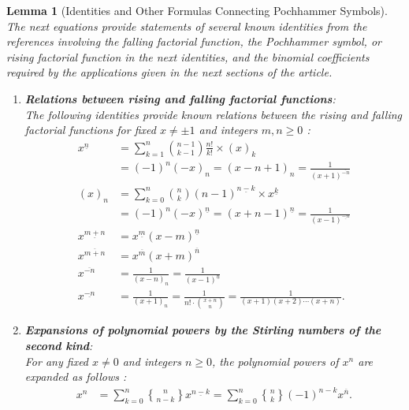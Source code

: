 \documentclass[12pt,reqno]{article}
\numberwithin{sfootnote}{section}
\numberwithin{equation}{section}
\newcommand{\itemlabel}[1]{\textbf{#1}: \\ }
\theoremstyle{plain}
\newtheorem{lemma}[theorem]{Lemma}
\theoremstyle{definition}
\theoremstyle{remark}
\newcommand{\cf}[0]{cf.\ }
\newcommand{\gkpSII}[2]{\ensuremath{\genfrac{\{}{\}}{0pt}{}{#1}{#2}}}
\newcommand{\FFactII}[2]{\ensuremath{#1^{\underline{#2}}}}
\newcommand{\RFactII}[2]{\ensuremath{#1^{\overline{#2}}}}
\newcommand{\Pochhammer}[2]{\ensuremath{\left(#1\right)_{#2}}}
\begin{document}
\begin{lemma}[Identities and Other Formulas Connecting Pochhammer Symbols] 
\label{lemma_footnote_PHSymbol_BinomIdents} 
The next equations provide statements of several known identities 
from the references involving the 
falling factorial function, the Pochhammer symbol, 
or rising factorial function in the next identities, and the 
binomial coefficients required by the applications given in the 
next sections of the article. 
\begin{enumerate} 
     \setlength{\itemsep}{-2mm} 

\item \itemlabel{Relations between rising and falling factorial functions} 
The following identities provide known relations between the 
rising and falling factorial functions for fixed $x \neq \pm 1$ and 
integers $m,n \geq 0$ 
\citep[\S 4.1.2, \S 5; \cf \S 4.3.1]{UC} 
\citep[\S 2, Ex.\ 2.17, 2.9, 2.16; \S 5.3; \S 6, Ex.\ 6.31, p.\ 552]{GKP}: 
\begin{align*} 
\tag{\em Connection Formulas} 
\FFactII{x}{n} 
     & = 
     \sum_{k=1}^{n} 
     \binom{n-1}{k-1} \frac{n!}{k!} \times \Pochhammer{x}{k} \\ 
     & = 
     (-1)^{n} \Pochhammer{-x}{n} = 
     \Pochhammer{x-n+1}{n} = 
     \frac{1}{\RFactII{(x+1)}{-n}} \\ 
\Pochhammer{x}{n} 
     & = 
     \sum_{k=0}^{n} 
     \binom{n}{k} \FFactII{(n-1)}{n-k} \times \FFactII{x}{k} \\ 
     & = 
     (-1)^{n} \FFactII{(-x)}{n} = 
     \FFactII{(x+n-1)}{n} = 
     \frac{1}{\FFactII{(x-1)}{-n}} \\ 
\tag{\em Generalized Exponent Laws} 
\FFactII{x}{m+n} 
     & = 
     \FFactII{x}{m} \FFactII{(x-m)}{n} \\ 
\RFactII{x}{m+n} 
     & = 
     \RFactII{x}{m} \RFactII{(x+m)}{n} \\  
\tag{\em Negative Rising and Falling Powers} 
\RFactII{x}{-n} 
     & = 
     \frac{1}{\Pochhammer{x-n}{n}} = 
     \frac{1}{\FFactII{(x-1)}{n}} \\ 
\FFactII{x}{-n} 
     & = 
     \frac{1}{\Pochhammer{x+1}{n}} = 
     \frac{1}{n! \cdot \binom{x+n}{n}} = 
     \frac{1}{(x+1)(x+2) \cdots (x+n)}. 
\end{align*} 

\item \itemlabel{Expansions of polynomial powers by the 
                 Stirling numbers of the second kind} 
For any fixed $x \neq 0$ and integers $n \geq 0$, the 
polynomial powers of $x^n$ are expanded as follows 
\citep[\S 6.1]{GKP}: 
\begin{align*} 
\tag{\em Expansions of Polynomial Powers} 
x^{n} 
     & = 
     \sum_{k=0}^{n} \gkpSII{n}{n-k} \FFactII{x}{n-k} = 
     \sum_{k=0}^{n} \gkpSII{n}{k} (-1)^{n-k} \RFactII{x}{n}. 
\end{align*} 


\end{enumerate}
\end{lemma}
\end{document}
